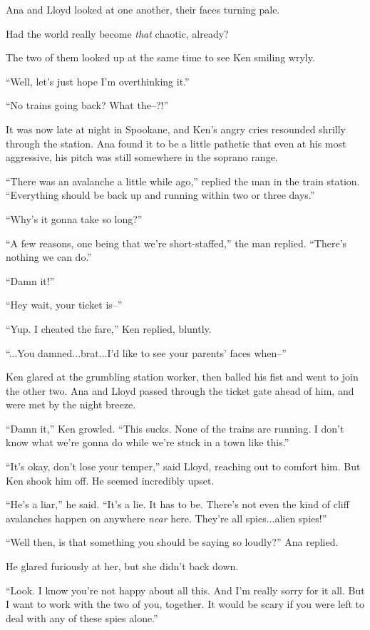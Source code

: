 \documentclass[
]{article}
\begin{document}
Ana and Lloyd looked at one another, their faces turning pale.

Had the world really become \emph{that} chaotic, already?

The two of them looked up at the same time to see Ken smiling wryly.

``Well, let's just hope I'm overthinking it.''

``No trains going back? What the--?!''

It was now late at night in Spookane, and Ken's angry cries resounded
shrilly through the station. Ana found it to be a little pathetic that
even at his most aggressive, his pitch was still somewhere in the
soprano range.

``There was an avalanche a little while ago,'' replied the man in the
train station. ``Everything should be back up and running within two or
three days.''

``Why's it gonna take so long?''

``A few reasons, one being that we're short-staffed,'' the man replied.
``There's nothing we can do.''

``Damn it!''

``Hey wait, your ticket is--''

``Yup. I cheated the fare,'' Ken replied, bluntly.

``...You damned...brat...I'd like to see your parents' faces when--''

Ken glared at the grumbling station worker, then balled his fist and
went to join the other two. Ana and Lloyd passed through the ticket gate
ahead of him, and were met by the night breeze.

``Damn it,'' Ken growled. ``This sucks. None of the trains are running.
I don't know what we're gonna do while we're stuck in a town like
this.''

``It's okay, don't lose your temper,'' said Lloyd, reaching out to
comfort him. But Ken shook him off. He seemed incredibly upset.

``He's a liar,'' he said. ``It's a lie. It has to be. There's not even
the kind of cliff avalanches happen on anywhere \emph{near} here.
They're all spies...alien spies!''

``Well then, is that something you should be saying so loudly?'' Ana
replied.

He glared furiously at her, but she didn't back down.

``Look. I know you're not happy about all this. And I'm really sorry for
it all. But I want to work with the two of you, together. It would be
scary if you were left to deal with any of these spies alone.''
\end{document}
